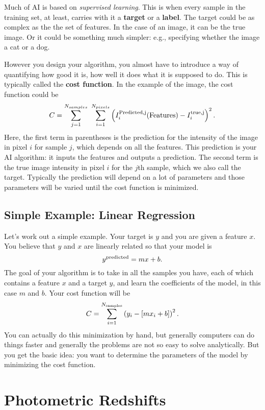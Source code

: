 \documentclass[prd,amsmath,aps,floats,amssymb, floatfix,
  superscriptaddress,nofootinbib]{revtex4-1}
\numberwithin{equation}{section}
\newcommand\be{\begin{equation}}
\newcommand\ee{\end{equation}}
\begin{document}
Much of AI is based on {\it supervised learning}. This is when every sample in the training set, at least, carries with it a {\bf target} or a {\bf label}. The target could be as complex as the the set of features. In the case of an image, it can be the true image. Or it could be something much simpler: e.g., specifying whether the image a cat or a dog.  

However you design your algorithm, you almost have to introduce a way of quantifying how good it is, how well it does what it is supposed to do. This is typically called the {\bf cost function}. In the example of the image, the cost function could be
\be
C = \sum_{j=1}^{N_{samples}}\ \sum_{i=1}^{N_{pixels}} \left( I^{\rm Predicted,j }_i({\rm Features}) - I^{\rm true, j}_i\right)^2.\ee
Here, the first term in parentheses is the prediction for the intensity of the image in pixel $i$ for sample $j$, which depends on all the features. This prediction is your AI algorithm: it inputs the features and outputs a prediction. The second term is the true image intensity in pixel $i$ for the $j$th sample, which we also call the target. Typically the prediction will depend on a lot of parameters and those parameters will be varied until the cost function is minimized.  

\subsection{Simple Example: Linear Regression}

Let's work out a simple example. Your target is $y$ and you are given a feature $x$. You believe that $y$ and $x$ are linearly related so that your model is
\be
y^{\rm predicted} = mx+b
.\ee
The goal of your algorithm is to take in all the samples you have, each of which contains a feature $x$ and a target $y$, and learn the coefficients of the model, in this case $m$ and $b$. Your cost function will be
\be
C = \sum_{i=1}^{N_{\rm samples}} \left( y_i - [mx_i+b]\right)^2.\ee
You can actually do this minimization by hand, but generally computers can do things faster and generally the problems are not so easy to solve analytically. But you get the basic idea: you want to determine the parameters of the model by minimizing the cost function.

\section{Photometric Redshifts}
\end{document}
